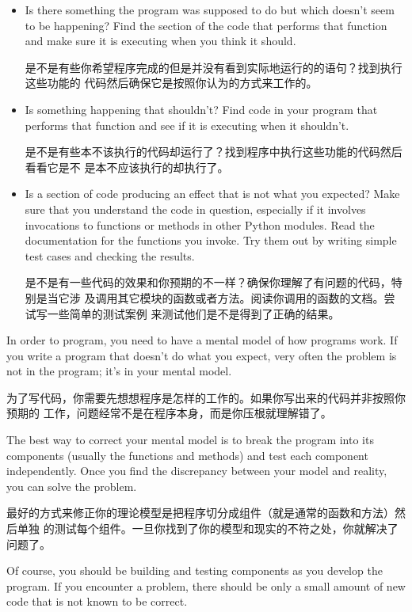 \documentclass[10pt]{book}
\begin{document}
\begin{CJK}{UTF8}{gbsn}
\begin{itemize}
\item Is there something the program was supposed to do but
which doesn't seem to be happening?  Find the section of the code
that performs that function and make sure it is executing when
you think it should.

是不是有些你希望程序完成的但是并没有看到实际地运行的的语句？找到执行这些功能的
代码然后确保它是按照你认为的方式来工作的。

\item Is something happening that shouldn't?  Find code in
your program that performs that function and see if it is
executing when it shouldn't.

是不是有些本不该执行的代码却运行了？找到程序中执行这些功能的代码然后看看它是不
是本不应该执行的却执行了。

\item Is a section of code producing an effect that is not
what you expected?  Make sure that you understand the code in
question, especially if it involves invocations to functions or methods in
other Python modules.  Read the documentation for the functions you invoke.
Try them out by writing simple test cases and checking the results.

是不是有一些代码的效果和你预期的不一样？确保你理解了有问题的代码，特别是当它涉
及调用其它模块的函数或者方法。阅读你调用的函数的文档。尝试写一些简单的测试案例
来测试他们是不是得到了正确的结果。

\end{itemize}

In order to program, you need to have a mental model of how
programs work.  If you write a program that doesn't do what you expect,
very often the problem is not in the program; it's in your mental
model.

为了写代码，你需要先想想程序是怎样的工作的。如果你写出来的代码并非按照你预期的
工作，问题经常不是在程序本身，而是你压根就理解错了。

The best way to correct your mental model is to break the program
into its components (usually the functions and methods) and test
each component independently.  Once you find the discrepancy
between your model and reality, you can solve the problem.

最好的方式来修正你的理论模型是把程序切分成组件（就是通常的函数和方法）然后单独
的测试每个组件。一旦你找到了你的模型和现实的不符之处，你就解决了问题了。

Of course, you should be building and testing components as you
develop the program.  If you encounter a problem,
there should be only a small amount of new code
that is not known to be correct.


\end{CJK}
\end{document}
